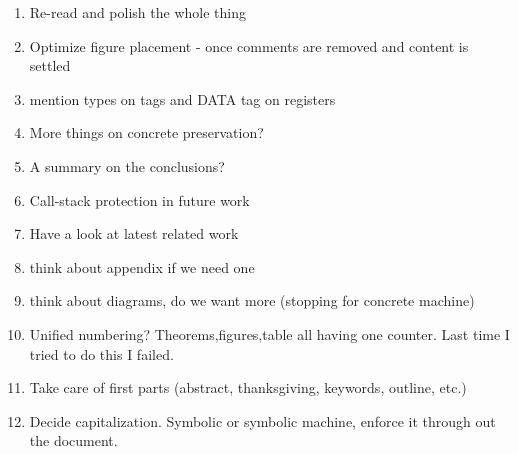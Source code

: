 \begin{enumerate}
\item Re-read and polish the whole thing
\item Optimize figure placement - once comments are removed and content is settled
\item mention types on tags and DATA tag on registers
\item More things on concrete preservation?
\item A summary on the conclusions?
\item Call-stack protection in future work
\item Have a look at latest related work
\item think about appendix if we need one
\item think about diagrams, do we want more (\EG stopping for concrete machine)
\item Unified numbering? Theorems,figures,table all having one counter. Last time
  I tried to do this I failed.
\item Take care of first parts (abstract, thanksgiving, keywords, outline, etc.)
\item Decide capitalization. Symbolic or symbolic machine, enforce it through out the document.
\end{enumerate}